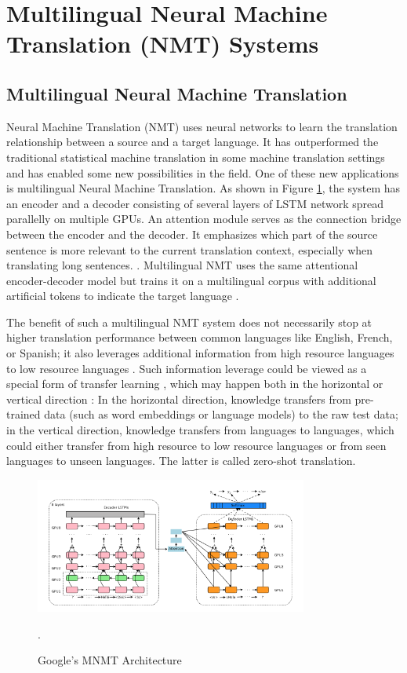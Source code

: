 \documentclass[thesis,fonts=libertine]{cluu}
\begin{document}
\section{Multilingual Neural Machine Translation (NMT) Systems}

\subsection{Multilingual Neural Machine Translation}

Neural Machine Translation (NMT) uses neural networks to learn the translation relationship between a source and a target language. It has outperformed the traditional statistical machine translation in some machine translation settings and has enabled some new possibilities in the field. One of these new applications is multilingual Neural Machine Translation. As shown in Figure \ref{fig:google_mnmt}, the system has an encoder and a decoder consisting of several layers of LSTM network spread parallelly on multiple GPUs. An attention module serves as the connection bridge between the encoder and the decoder. It emphasizes which part of the source sentence is more relevant to the current translation context, especially when translating long sentences. \parencite{Wu:2016aa}. Multilingual NMT uses the same attentional encoder-decoder model but trains it on a multilingual corpus with additional artificial tokens to indicate the target language \parencite{Johnson:2016aa}.

The benefit of such a multilingual NMT system does not necessarily stop at higher translation performance between common languages like English, French, or Spanish; it also leverages additional information from high resource languages to low resource languages \parencite{Zoph:2016aa}. Such information leverage could be viewed as a special form of transfer learning \parencite{Zoph:2016aa}, which may happen both in the horizontal or vertical direction \parencite{Lakew:2019aa}: In the horizontal direction, knowledge transfers from pre-trained data (such as word embeddings or language models) to the raw test data; in the vertical direction, knowledge transfers from languages to languages, which could either transfer from high resource to low resource languages or from seen languages to unseen languages. The latter is called zero-shot translation.

\begin{figure}
  \centering
  \includegraphics[width=0.8\textwidth]{google_mnmt_architecture.png}
  \caption{Google's MNMT Architecture \parencite{Johnson:2016aa,Wu:2016aa}}.
  \label{fig:google_mnmt}
\end{figure}
\end{document}
